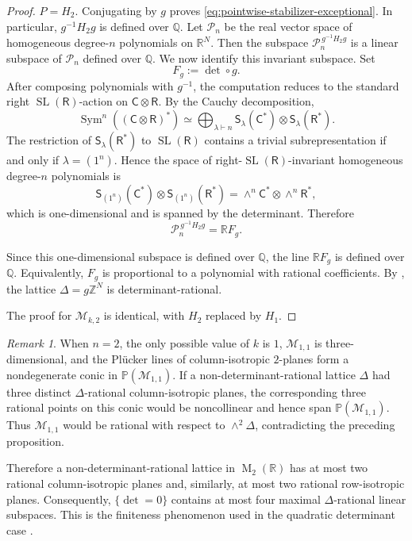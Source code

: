\documentclass[reqno,11pt]{amsart}
\numberwithin{equation}{section}
\theoremstyle{definition}
\theoremstyle{remark}
\newtheorem{remark}[theorem]{Remark}
\newcommand{\op}{\operatorname}
\newcommand{\M}{\op{M}}
\newcommand{\SL}{\op{SL}}
\begin{document}
\begin{proof}
$P=H_2$.
Conjugating by $g$ proves \eqref{eq:pointwise-stabilizer-exceptional}.
In particular, $g^{-1}H_2g$ is
defined over $\mathbb Q$. Let $\mathcal P_n$ be the real vector space of
homogeneous degree-$n$ polynomials on $\mathbb R^N$. Then the subspace
$
\mathcal P_n^{\,g^{-1}H_2g}
$
is a 
linear subspace of $\mathcal P_n$ defined over $\mathbb Q$.
We now identify this invariant subspace. Set
$$
F_g:=\det\circ g.
$$
After composing polynomials with $g^{-1}$, the computation reduces to the
standard right $\SL(\mathsf R)$-action on
$\mathsf C\otimes\mathsf R$. By the Cauchy decomposition,
$$
\operatorname{Sym}^n((\mathsf C\otimes\mathsf R)^*)
\simeq
\bigoplus_{\lambda\vdash n}
{\mathsf S}_\lambda(\mathsf C^*)\otimes
{\mathsf S}_\lambda(\mathsf R^*).
$$
The restriction of ${\mathsf S}_\lambda(\mathsf R^*)$ to
$\SL(\mathsf R)$ contains a trivial subrepresentation if and only if
$\lambda=(1^n)$. Hence the space of right-$\SL(\mathsf R)$-invariant
homogeneous degree-$n$ polynomials is
$$
{\mathsf S}_{(1^n)}(\mathsf C^*)\otimes
{\mathsf S}_{(1^n)}(\mathsf R^*)
=
\wedge^n\mathsf C^*\otimes\wedge^n\mathsf R^*,
$$
which is one-dimensional and is spanned by the determinant. Therefore
$$
\mathcal P_n^{\,g^{-1}H_2g}
=
\mathbb R F_g.
$$

Since this one-dimensional subspace is defined over $\mathbb Q$, the line
$\mathbb R F_g$ is defined over $\mathbb Q$. Equivalently, $F_g$ is
proportional to a polynomial with rational coefficients. By
, the lattice
$\Delta=g\mathbb Z^N$ is determinant-rational.

The proof for $\mathcal M_{k,2}$ is identical, with $H_2$ replaced by $H_1$.
\end{proof}

\begin{remark}
When $n=2$, the only possible value of $k$ is $1$,
$\mathcal M_{1,1}$ is three-dimensional, and the Pl\"ucker lines of
column-isotropic $2$-planes form a nondegenerate conic in
$\mathbb P(\mathcal M_{1,1})$. If a non-determinant-rational lattice
$\Delta$ had three distinct $\Delta$-rational column-isotropic planes, the
corresponding three rational points on this conic would be noncollinear and
hence span $\mathbb P(\mathcal M_{1,1})$. Thus $\mathcal M_{1,1}$ would be
rational with respect to $\wedge^2\Delta$, contradicting the preceding
proposition.

Therefore a non-determinant-rational lattice in $\M_2(\mathbb R)$ has at
most two rational column-isotropic planes and, similarly, at most two
rational row-isotropic planes. Consequently, $\{\det=0\}$ contains at most
four maximal $\Delta$-rational linear subspaces. This is the finiteness
phenomenon used in the quadratic determinant case
\cite{eskin-margulis-mozes:2005}.
\end{remark}
\end{document}
